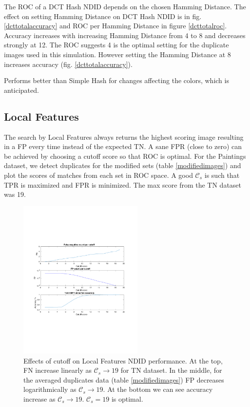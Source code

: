 \documentclass[english,12pt,a4paper,pdftex,elec,utf8, table]{aaltothesis}
\begin{document}
The ROC of a DCT Hash NDID depends on the chosen Hamming Distance. The effect on setting Hamming Distance on DCT Hash NDID is in fig. \ref{dcttotalaccuracy} and ROC per Hamming Distance in figure \ref{dcttotalroc}. Accuracy increases with increasing Hamming Distance from 4 to 8 and decreases strongly at 12. The ROC suggests 4 is the optimal setting for the duplicate images used in this simulation. However setting the Hamming Distance at 8 increases accuracy (fig. \ref{dcttotalaccuracy}).

Performs better than Simple Hash for changes affecting the colors, which is anticipated.

\subsection{Local Features}
The search by Local Features always returns the highest scoring image resulting in a FP every time instead of the expected TN. A sane FPR (close to zero) can be achieved by choosing a cutoff score so that ROC is optimal. For the Paintings dataset, we detect duplicates for the modified sets (table \ref{modifiedimages}) and plot the scores of matches from each set in ROC space. A good $\mathcal{C}_s$ is such that TPR is maximized and FPR is minimized. The max score from the TN dataset was 19.

\begin{figure}[htb]
\begin{center}
\includegraphics[height=8cm]{figures/SIFTCountROC}
\end{center}
\caption{ Effects of cutoff on Local Features NDID performance. At the top, FN increase linearly as $\mathcal{C}_s \rightarrow 19$ for TN dataset. In the middle, for the averaged duplicates data (table \ref{modifiedimages}) FP decreases logarithmically as $\mathcal{C}_s \rightarrow 19$. At the bottom we can see accuracy increase as $\mathcal{C}_s \rightarrow 19$. $\mathcal{C}_s=19$ is optimal.}
\label{figcutoff}
\end{figure}
\end{document}
